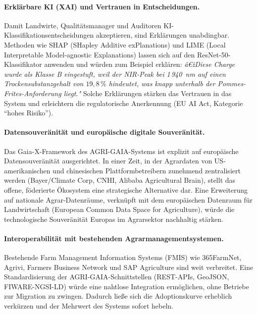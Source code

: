 \documentclass[a4paper, 12pt, twoside, openright]{report}
\theoremstyle{definition}
\theoremstyle{definition}
\begin{document}
\paragraph{Erklärbare KI (XAI) und Vertrauen in Entscheidungen.}
Damit Landwirte, Qualitätsmanager und Auditoren KI-Klassifikationsentscheidungen
akzeptieren, sind Erklärungen unabdingbar. Methoden wie SHAP
(SHapley Additive exPlanations) und LIME (Local Interpretable
Model-agnostic Explanations) lassen sich auf den ResNet-50-Klassifikator
anwenden und würden zum Beispiel erklären: \textit{â€žDiese Charge
wurde als Klasse B eingestuft, weil der NIR-Peak bei 1\,940~nm
auf einen Trockensubstanzgehalt von $19{,}8\,\%$ hindeutet, was
knapp unterhalb der Pommes-Frites-Anforderung liegt."} Solche
Erklärungen stärken das Vertrauen in das System und erleichtern
die regulatorische Anerkennung (EU AI Act, Kategorie ``hohes Risiko'').

\paragraph{Datensouveränität und europäische digitale Souveränität.}
Das Gaia-X-Framework des AGRI-GAIA-Systems ist explizit auf
europäische Datensouveränität ausgerichtet. In einer Zeit, in der
Agrardaten von US-amerikanischen und chinesischen Plattformbetreibern
zunehmend zentralisiert werden (Bayer/Climate Corp, CNHI,
Alibaba Agricultural Brain), stellt das offene, föderierte
Ökosystem eine strategische Alternative dar. Eine Erweiterung
auf nationale Agrar-Datenräume, verknüpft mit dem europäischen
Datenraum für Landwirtschaft (European Common Data Space
for Agriculture), würde die technologische Souveränität Europas
im Agrarsektor nachhaltig stärken.

\paragraph{Interoperabilität mit bestehenden Agrarmanagementsystemen.}
Bestehende Farm Management Information Systems (FMIS) wie
365FarmNet, Agrivi, Farmers Business Network und SAP Agriculture
sind weit verbreitet. Eine Standardisierung der AGRI-GAIA-Schnittstellen
(REST-APIs, GeoJSON, FIWARE-NGSI-LD) würde eine nahtlose
Integration ermöglichen, ohne Betriebe zur Migration zu zwingen.
Dadurch ließe sich die Adoptionskurve erheblich verkürzen und
der Mehrwert des Systems sofort hebeln.
\end{document}
